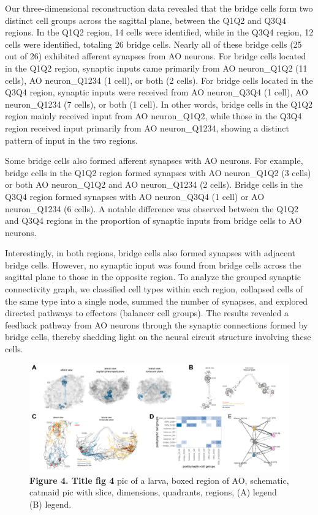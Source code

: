 \documentclass[
  11pt,
]{article}
\begin{document}
Our three-dimensional reconstruction data revealed that the bridge cells
form two distinct cell groups across the sagittal plane, between the
Q1Q2 and Q3Q4 regions. In the Q1Q2 region, 14 cells were identified,
while in the Q3Q4 region, 12 cells were identified, totaling 26 bridge
cells. Nearly all of these bridge cells (25 out of 26) exhibited
afferent synapses from AO neurons. For bridge cells located in the Q1Q2
region, synaptic inputs came primarily from AO neuron\_Q1Q2 (11 cells),
AO neuron\_Q1234 (1 cell), or both (2 cells). For bridge cells located
in the Q3Q4 region, synaptic inputs were received from AO neuron\_Q3Q4
(1 cell), AO neuron\_Q1234 (7 cells), or both (1 cell). In other words,
bridge cells in the Q1Q2 region mainly received input from AO
neuron\_Q1Q2, while those in the Q3Q4 region received input primarily
from AO neuron\_Q1234, showing a distinct pattern of input in the two
regions.

Some bridge cells also formed afferent synapses with AO neurons. For
example, bridge cells in the Q1Q2 region formed synapses with AO
neuron\_Q1Q2 (3 cells) or both AO neuron\_Q1Q2 and AO neuron\_Q1234 (2
cells). Bridge cells in the Q3Q4 region formed synapses with AO
neuron\_Q3Q4 (1 cell) or AO neuron\_Q1234 (6 cells). A notable
difference was observed between the Q1Q2 and Q3Q4 regions in the
proportion of synaptic inputs from bridge cells to AO neurons.

Interestingly, in both regions, bridge cells also formed synapses with
adjacent bridge cells. However, no synaptic input was found from bridge
cells across the sagittal plane to those in the opposite region. To
analyze the grouped synaptic connectivity graph, we classified cell
types within each region, collapsed cells of the same type into a single
node, summed the number of synapses, and explored directed pathways to
effectors (balancer cell groups). The results revealed a feedback
pathway from AO neurons through the synaptic connections formed by
bridge cells, thereby shedding light on the neural circuit structure
involving these cells.

\begin{figure}[H]

{\centering \includegraphics[width=1\textwidth,height=\textheight]{figures/Figure4.png}

}

\caption{\textbf{Figure 4. Title fig 4} pic of a larva, boxed region of
AO, schematic, catmaid pic with slice, dimensions, quadrants, regions,
(A) legend (B) legend.}

\end{figure}%
\end{document}
